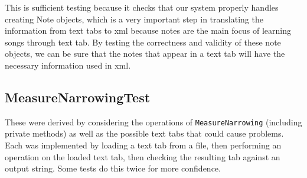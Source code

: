 \documentclass[11pt]{article}
\begin{document}
This is sufficient testing because it checks that our system properly handles creating Note objects, which is a very important step in translating the information from text tabs to xml because notes are the main focus of learning songs through text tab. By testing the correctness and validity of these note objects, we can be sure that the notes that appear in a text tab will have the necessary information used in xml.\\
\subsection{MeasureNarrowingTest}
\label{sec:org43e9d52}
These were derived by considering the operations of \texttt{MeasureNarrowing} (including private methods) as well as the possible text tabs that could cause problems.\\
Each was implemented by loading a text tab from a file, then performing an operation on the loaded text tab, then checking the resulting tab against an output string.  Some tests do this twice for more confidence.\\
\end{document}

